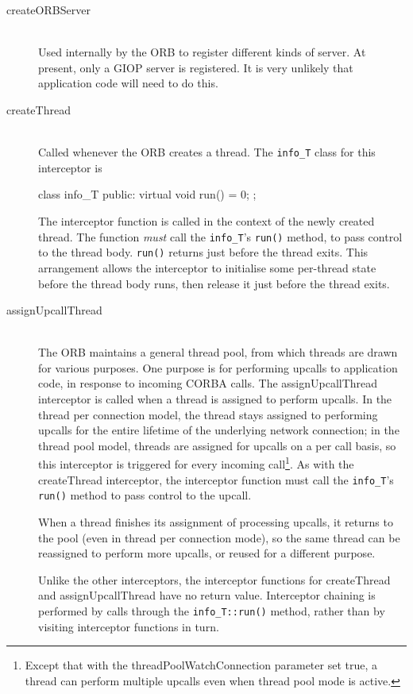 \documentclass[11pt,twoside,a4paper]{book}
\newcommand{\type}[1]{\texttt{#1}}
\newcommand{\op}[1]{\texttt{#1()}}
\begin{document}
\begin{description}
\item[createORBServer]\mbox{}\\
%
Used internally by the ORB to register different kinds of server. At
present, only a GIOP server is registered. It is very unlikely that
application code will need to do this.


\item[createThread]\mbox{}\\
%
Called whenever the ORB creates a thread. The \type{info\_T} class for
this interceptor is

\begin{cxxlisting}
    class info_T {
    public:
      virtual void run() = 0;
    };
\end{cxxlisting}

\noindent
The interceptor function is called in the context of the newly created
thread. The function \emph{must} call the \type{info\_T}'s \op{run}
method, to pass control to the thread body. \op{run} returns just
before the thread exits. This arrangement allows the interceptor to
initialise some per-thread state before the thread body runs, then
release it just before the thread exits.


\item[assignUpcallThread]\mbox{}\\
%
The ORB maintains a general thread pool, from which threads are drawn
for various purposes. One purpose is for performing upcalls to
application code, in response to incoming CORBA calls. The
assignUpcallThread interceptor is called when a thread is assigned to
perform upcalls. In the thread per connection model, the thread stays
assigned to performing upcalls for the entire lifetime of the
underlying network connection; in the thread pool model, threads are
assigned for upcalls on a per call basis, so this interceptor is
triggered for every incoming call\footnote{Except that with the
threadPoolWatchConnection parameter set true, a thread can perform
multiple upcalls even when thread pool mode is active.}. As with the
createThread interceptor, the interceptor function must call the
\type{info\_T}'s \op{run} method to pass control to the upcall.

When a thread finishes its assignment of processing upcalls, it
returns to the pool (even in thread per connection mode), so the same
thread can be reassigned to perform more upcalls, or reused for a
different purpose.

Unlike the other interceptors, the interceptor functions for
createThread and assignUpcallThread have no return value. Interceptor
chaining is performed by calls through the \op{info\_T::run} method,
rather than by visiting interceptor functions in turn.



\end{description}
\end{document}
